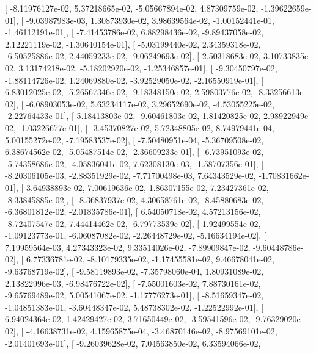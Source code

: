 \documentclass{article}
\begin{document}
       [ -8.11976127e-02,   5.37218665e-02,  -5.05667894e-02,
          4.87309759e-02,  -1.39622659e-01],
       [ -9.03987983e-03,   1.30873930e-02,   3.98639564e-02,
         -1.00152441e-01,  -1.46112191e-01],
       [ -7.41453786e-02,   6.88298436e-02,  -9.89437058e-02,
          2.12221119e-02,  -1.30640154e-01],
       [ -5.03199440e-02,   2.34359318e-02,  -6.50525886e-02,
          2.44059233e-02,  -9.06249693e-02],
       [  2.50318683e-02,   3.10733835e-02,   3.13174218e-02,
         -5.18202920e-02,  -1.25346857e-01],
       [ -9.30450797e-02,  -1.88114726e-02,   1.24069880e-02,
         -3.92529050e-02,  -2.16550919e-01],
       [  6.83012025e-02,  -5.26567346e-02,  -9.18348150e-02,
          2.59803776e-02,  -8.33256613e-02],
       [ -6.08903053e-02,   5.63234117e-02,   3.29652690e-02,
         -4.53055225e-02,  -2.22764433e-01],
       [  5.18413803e-02,  -9.60461803e-02,   1.81420825e-02,
          2.98922949e-02,  -1.03226677e-01],
       [ -3.45370827e-02,   5.72348805e-02,   8.74979441e-04,
          5.00155272e-02,  -7.19583537e-02],
       [ -7.50480951e-04,  -5.36709508e-02,   6.38674562e-02,
         -5.05487514e-02,  -2.36609233e-01],
       [ -6.73951093e-02,  -5.74358686e-02,  -4.05836041e-02,
          7.62308130e-03,  -1.58707356e-01],
       [ -8.20306105e-03,  -2.88351929e-02,  -7.71700498e-03,
          7.64343529e-02,  -1.70831662e-01],
       [  3.64938893e-02,   7.00619636e-02,   1.86307155e-02,
          7.23427361e-02,  -8.33845885e-02],
       [ -8.36837937e-02,   4.30658761e-02,  -8.45880683e-02,
         -6.36801812e-02,  -2.01835786e-01],
       [  6.54050718e-02,   4.57213156e-02,  -8.72407547e-02,
          7.44414462e-02,  -6.79773539e-02],
       [  1.92499554e-02,  -1.09123773e-01,  -6.06087082e-02,
         -2.26448729e-02,  -5.16634194e-02],
       [  7.19959564e-03,   4.27343323e-02,   9.33514026e-02,
         -7.89909847e-02,  -9.60448786e-02],
       [  6.77336781e-02,  -8.10179335e-02,  -1.17455581e-02,
          9.46678041e-02,  -9.63768719e-02],
       [ -9.58119893e-02,  -7.35798060e-04,   1.80931089e-02,
          2.13822996e-03,  -6.98476722e-02],
       [ -7.55001603e-02,   7.88730161e-02,  -9.65769489e-02,
          5.00541067e-02,  -1.17776273e-01],
       [ -8.51659347e-02,  -1.04851383e-01,  -3.60448347e-02,
          5.48738302e-02,  -1.22522992e-01],
       [  6.94024364e-02,   1.42429427e-02,   3.71650449e-02,
         -3.59541596e-02,  -9.76329020e-02],
       [ -4.16638731e-02,   4.15965875e-04,  -3.46870146e-02,
         -8.97569101e-02,  -2.01401693e-01],
       [ -9.26039628e-02,   7.04563850e-02,   6.33594066e-02,
\end{document}
